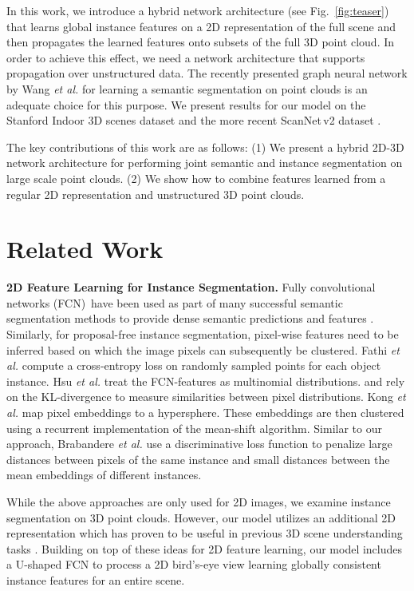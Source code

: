\documentclass[runningheads]{llncs}
\newcommand{\reffig}[1]{Fig.~\ref{fig:#1}}
\newcommand{\subsubsubsection}[1]{\vspace{4px} \noindent \textbf{#1}}
\newcommand{\etal}{\textit{et al. }}
\begin{document}
In this work, we introduce a hybrid network architecture (see \reffig{teaser}) that learns global instance features on a 2D representation of the full scene and then propagates the learned features onto subsets of the full 3D point cloud.
In order to achieve this effect, we need a network architecture that supports propagation over unstructured data.
The recently presented graph neural network by Wang \etal \cite{Wang18CoRR} for learning a semantic segmentation on point clouds is an adequate choice for this purpose.
We present results for our model on the Stanford Indoor 3D scenes dataset \cite{Armeni16CVPR} and the more recent ScanNet\,v2 dataset \cite{Dai17CVPR}.

The key contributions of this work are as follows:
(1) We present a hybrid 2D-3D network architecture for performing joint semantic and instance segmentation on large scale point clouds.
(2) We show how to combine features learned from a regular 2D representation and unstructured 3D point clouds. 
 

\section{Related Work}
\subsubsubsection{2D Feature Learning for Instance Segmentation.}
Fully convolutional networks (FCN)\,\cite{Shelhamer17PAMI} have been used as part of many successful semantic segmentation methods to provide dense semantic predictions and features \cite{Ronneberger15MICCAI,Badrinarayanan15PAMI,Chen18ECCV}.
Similarly, for proposal-free instance segmentation, pixel-wise features need to be inferred based on which the image pixels can subsequently be clustered.
Fathi \etal \cite{Fathi17CoRR} compute a cross-entropy loss on randomly sampled points for each object instance.
Hsu \etal \cite{Hsu18IJCNN} treat the FCN-features as multinomial distributions.
and rely on the KL-divergence to measure similarities between pixel distributions.
Kong \etal \cite{Kong18CVPR} map pixel embeddings to a hypersphere.
These embeddings are then clustered using a recurrent implementation of the mean-shift algorithm.
Similar to our approach, Brabandere \etal \cite{Brabandere17CVPRW} use a discriminative loss function to penalize large distances between pixels of the same instance and small distances between the mean embeddings of different instances.

While the above approaches are only used for 2D images, we examine instance segmentation on 3D point clouds.
However, our model utilizes an additional 2D representation which has proven to be useful in previous 3D scene understanding tasks \cite{Boulch17CG,Chen17CVPR,Simon18CoRR,Dai18ECCV}.
Building on top of these ideas for 2D feature learning, our model includes a U-shaped \cite{Ronneberger15MICCAI} FCN to process a 2D bird's-eye view learning globally consistent instance features for an entire scene. 
\end{document}
